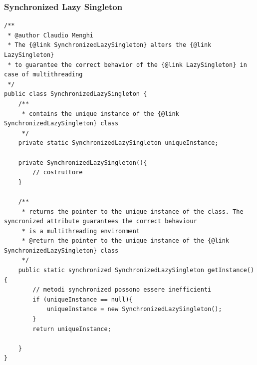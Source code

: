 \documentclass{article}
\begin{document}
\subsubsection{Synchronized Lazy Singleton}
\begin{lstlisting}
/**
 * @author Claudio Menghi
 * The {@link SynchronizedLazySingleton} alters the {@link LazySingleton} 
 * to guarantee the correct behavior of the {@link LazySingleton} in case of multithreading 
 */
public class SynchronizedLazySingleton {
	/**
	 * contains the unique instance of the {@link SynchronizedLazySingleton} class
	 */
	private static SynchronizedLazySingleton uniqueInstance;
	
	private SynchronizedLazySingleton(){
		// costruttore
	}
	
	/**
	 * returns the pointer to the unique instance of the class. The syncronized attribute guarantees the correct behaviour
	 * is a multithreading environment
	 * @return the pointer to the unique instance of the {@link SynchronizedLazySingleton} class
	 */
	public static synchronized SynchronizedLazySingleton getInstance(){
		// metodi synchronized possono essere inefficienti
		if (uniqueInstance == null){
			uniqueInstance = new SynchronizedLazySingleton();
		}
		return uniqueInstance;
			
	}
}
\end{lstlisting}
\end{document}
